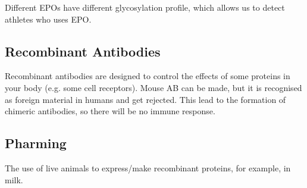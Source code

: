 Different EPOs have different glycosylation profile, which allows us to detect athletes who uses EPO.

\subsection{Recombinant Antibodies}

Recombinant antibodies are designed to control the effects of some proteins in your body (e.g. some cell receptors).
Mouse AB can be made, but it is recognised as foreign material in humans and get rejected.
This lead to the formation of chimeric antibodies, so there will be no immune response.

\subsection{Pharming}

The use of live animals to express/make recombinant proteins, for example, in milk.

